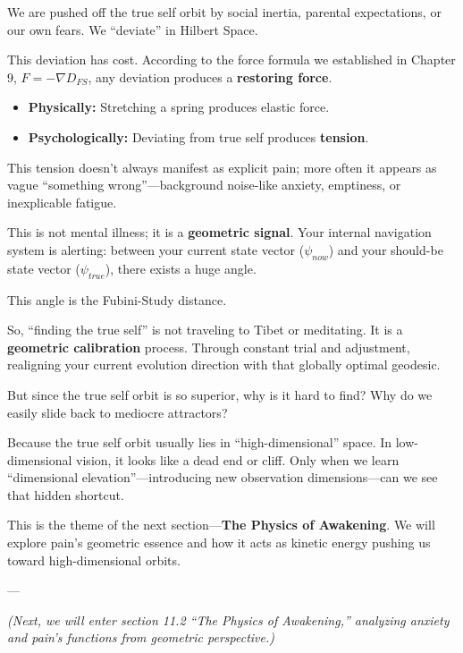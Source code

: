 We are pushed off the true self orbit by social inertia, parental expectations, or our own fears. We ``deviate'' in Hilbert Space.

This deviation has cost. According to the force formula we established in Chapter 9, $F = -\nabla D_{FS}$, any deviation produces a \textbf{restoring force}.

\begin{itemize}
\item \textbf{Physically:} Stretching a spring produces elastic force.

\item \textbf{Psychologically:} Deviating from true self produces \textbf{tension}.
\end{itemize}

This tension doesn't always manifest as explicit pain; more often it appears as vague ``something wrong''---background noise-like anxiety, emptiness, or inexplicable fatigue.

This is not mental illness; it is a \textbf{geometric signal}. Your internal navigation system is alerting: between your current state vector ($\psi_{now}$) and your should-be state vector ($\psi_{true}$), there exists a huge angle.

This angle is the Fubini-Study distance.

So, ``finding the true self'' is not traveling to Tibet or meditating. It is a \textbf{geometric calibration} process. Through constant trial and adjustment, realigning your current evolution direction with that globally optimal geodesic.

But since the true self orbit is so superior, why is it hard to find? Why do we easily slide back to mediocre attractors?

Because the true self orbit usually lies in ``high-dimensional'' space. In low-dimensional vision, it looks like a dead end or cliff. Only when we learn ``dimensional elevation''---introducing new observation dimensions---can we see that hidden shortcut.

This is the theme of the next section---\textbf{The Physics of Awakening}. We will explore pain's geometric essence and how it acts as kinetic energy pushing us toward high-dimensional orbits.

---

\textit{(Next, we will enter section 11.2 ``The Physics of Awakening,'' analyzing anxiety and pain's functions from geometric perspective.)}


